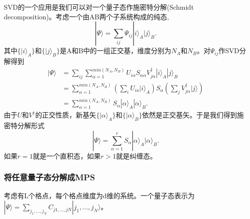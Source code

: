 \documentclass[12pt]{article}
\begin{document}
       SVD的一个应用是我们可以对一个量子态作施密特分解(Schmidt decomposition)。考虑一个由AB两个子系统构成的纯态, 
       \begin{equation}|\Psi \rangle=\sum_{ij}\Psi_{ij}|i\rangle_A|j\rangle_B.\end{equation}
       其中$\{|i\rangle_A\}$和$\{|j\rangle_B\}$是A和B中的一组正交基，维度分别为$N_A$和$N_B$。对$\Psi_{ij}$作SVD分解得到
       \begin{equation}\begin{split}|\Psi\rangle &=\sum_{ij}\sum_{\alpha=1}^{min(N_A,N_B)}U_{i\alpha}S_{\alpha\alpha}V^{\dagger}_{j\alpha}|i\rangle_A|j\rangle_B\\ &=\sum_{\alpha=1}^{min(N_A,N_B)}(\sum_i U_{ia}|i\rangle_A)S_\alpha(\sum_jV^{\dagger}_{j\alpha}|j\rangle)\\ &=\sum_{\alpha=1}^{min(N_A,N_B)}S_\alpha|\alpha\rangle_A|\alpha\rangle_B.\end{split}\end{equation}
       由于$U$和$V^\dagger$的正交性质，新基矢$\{|\alpha\rangle_A\}$和$\{|\alpha\rangle_B\}$依然是正交基矢。于是我们得到施密特分解形式
       \begin{equation}|\Psi\rangle=\sum_{\alpha=1}^rS_\alpha|\alpha\rangle_A|\alpha\rangle_B.\end{equation}
       如果$r=1$就是一个直积态，如果$r>1$就是纠缠态。
       
       \subsubsection{将任意量子态分解成MPS}
       考虑有L个格点，每个格点维度为d维的系统。一个量子态表示为$|\Psi\rangle=\sum_{j_1,...,j_N}C_{j1,...,jN}|j_1,...,j_N\rangle$。
       
\end{document}
